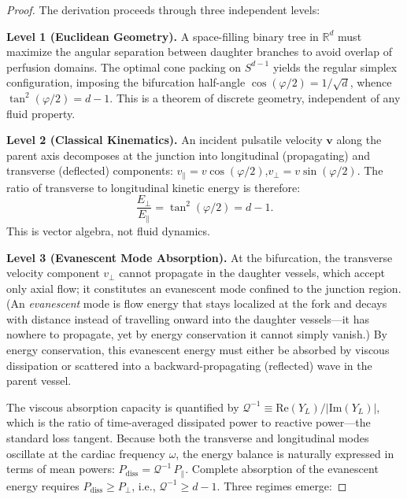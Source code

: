 \begin{proof}
The derivation proceeds through three independent levels:

\textbf{Level 1 (Euclidean Geometry).} A space-filling binary tree in
$\mathbb{R}^d$ must maximize the angular separation between daughter branches to
avoid overlap of perfusion domains. The optimal cone packing on $S^{d-1}$ yields
the regular simplex configuration, imposing the bifurcation half-angle
$\cos(\varphi/2) = 1/\sqrt{d}$, whence $\tan^2(\varphi/2) = d - 1$. This is a
theorem of discrete geometry, independent of any fluid property.

\textbf{Level 2 (Classical Kinematics).} An incident pulsatile velocity
$\mathbf{v}$ along the parent axis decomposes at the junction into longitudinal
(propagating) and transverse (deflected) components: $v_\parallel =
v\cos(\varphi/2)$,\quad $v_\perp = v\sin(\varphi/2)$. The ratio of transverse to
longitudinal kinetic energy is therefore:
\begin{equation}
\frac{E_\perp}{E_\parallel} = \tan^2(\varphi/2) = d - 1.
\label{eq:kinematic_ratio}
\end{equation}
This is vector algebra, not fluid dynamics.

\textbf{Level 3 (Evanescent Mode Absorption).} At the bifurcation, the
transverse velocity component $v_\perp$ cannot propagate in the daughter
vessels, which accept only axial flow; it constitutes an evanescent mode
confined to the junction region. (An \emph{evanescent} mode is flow energy
that stays localized at the fork and decays with distance instead of travelling
onward into the daughter vessels---it has nowhere to propagate, yet by energy
conservation it cannot simply vanish.) By energy conservation, this evanescent
energy must either be absorbed by viscous dissipation or scattered into a
backward-propagating (reflected) wave in the parent vessel.

The viscous absorption capacity is quantified by $\mathcal{Q}^{-1} \equiv
\mathrm{Re}(Y_L)/|\mathrm{Im}(Y_L)|$, which is the ratio of time-averaged
dissipated power to reactive power---the standard loss tangent. Because both the
transverse and longitudinal modes oscillate at the cardiac frequency $\omega$,
the energy balance is naturally expressed in terms of mean powers:
$P_{\mathrm{diss}} = \mathcal{Q}^{-1}\, P_\parallel$. Complete absorption of the
evanescent energy requires $P_{\mathrm{diss}} \ge P_\perp$, i.e.,
$\mathcal{Q}^{-1} \ge d-1$. Three regimes emerge:


\end{proof}
